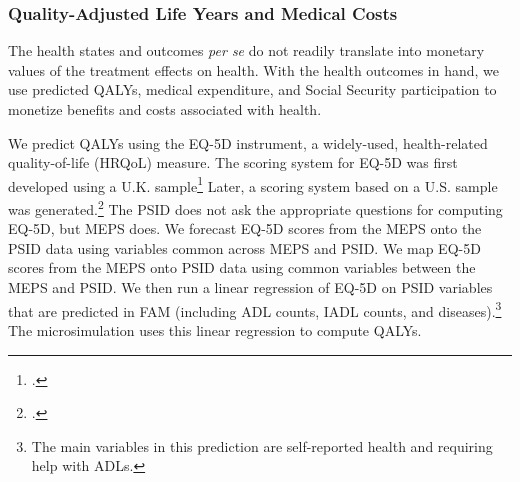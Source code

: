 \subsubsection{Quality-Adjusted Life Years and Medical Costs} \label{section:qalys}

\noindent The health states and outcomes \textit{per se} do not readily translate into monetary values of the treatment effects on health. With the health outcomes in hand, we use predicted QALYs, medical expenditure, and Social Security participation to monetize benefits and costs associated with health.

We predict QALYs using the EQ-5D instrument, a widely-used, health-related quality-of-life (HRQoL) measure. The scoring system for EQ-5D was first developed using a U.K. sample\footnote{\citet{Dolan_1997_Modeling_MC}.} Later, a scoring system based on a U.S. sample was generated.\footnote{\citet{Shaw_etal_2005_EQ5D_MC}.} The PSID does not ask the appropriate questions for computing EQ-5D, but MEPS does. We forecast EQ-5D scores from the MEPS onto the PSID data using variables common across MEPS and PSID. We map EQ-5D scores from the MEPS onto PSID data using common variables between the MEPS and PSID. We then run a linear regression of EQ-5D on PSID variables that are predicted in FAM (including ADL counts, IADL counts, and diseases).\footnote{The main variables in this prediction are self-reported health and requiring help with ADLs.} The microsimulation uses this linear regression to compute QALYs.


